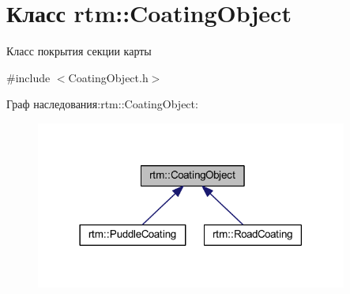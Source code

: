 \hypertarget{classrtm_1_1_coating_object}{}\section{Класс rtm\+:\+:Coating\+Object}
\label{classrtm_1_1_coating_object}


Класс покрытия секции карты  




{\ttfamily \#include $<$Coating\+Object.\+h$>$}



Граф наследования\+:rtm\+:\+:Coating\+Object\+:
\nopagebreak
\begin{figure}[H]
\begin{center}
\leavevmode
\includegraphics[width=290pt]{classrtm_1_1_coating_object__inherit__graph}
\end{center}
\end{figure}
